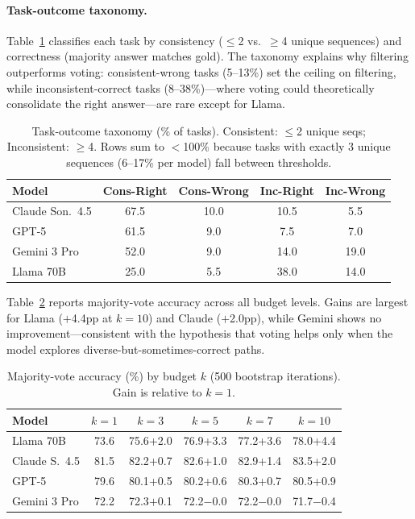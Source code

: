 \documentclass{article}
\begin{document}
\paragraph{Task-outcome taxonomy.} Table~\ref{tab:taxonomy} classifies each task by consistency ($\leq$2 vs.\ $\geq$4 unique sequences) and correctness (majority answer matches gold). The taxonomy explains why filtering outperforms voting: consistent-wrong tasks (5--13\%) set the ceiling on filtering, while inconsistent-correct tasks (8--38\%)---where voting could theoretically consolidate the right answer---are rare except for Llama.

\begin{table}[h]
\centering
\small
\caption{Task-outcome taxonomy (\% of tasks). Consistent: $\leq$2 unique seqs; Inconsistent: $\geq$4. Rows sum to $<$100\% because tasks with exactly 3 unique sequences (6--17\% per model) fall between thresholds.}
\label{tab:taxonomy}
\scriptsize
\begin{tabular}{l@{\hskip 4pt}c@{\hskip 4pt}c@{\hskip 4pt}c@{\hskip 4pt}c}
\toprule
\textbf{Model} & \textbf{Cons-Right} & \textbf{Cons-Wrong} & \textbf{Inc-Right} & \textbf{Inc-Wrong} \\
\midrule
Claude Son.\ 4.5 & 67.5 & 10.0 & 10.5 & 5.5 \\
GPT-5 & 61.5 & 9.0 & 7.5 & 7.0 \\
Gemini 3 Pro & 52.0 & 9.0 & 14.0 & 19.0 \\
Llama 70B & 25.0 & 5.5 & 38.0 & 14.0 \\
\bottomrule
\end{tabular}
\end{table}

Table~\ref{tab:vote_full} reports majority-vote accuracy across all budget levels. Gains are largest for Llama ($+$4.4pp at $k\!=\!10$) and Claude ($+$2.0pp), while Gemini shows no improvement---consistent with the hypothesis that voting helps only when the model explores diverse-but-sometimes-correct paths.

\begin{table}[h]
\centering
\small
\caption{Majority-vote accuracy (\%) by budget $k$ (500 bootstrap iterations). Gain is relative to $k\!=\!1$.}
\label{tab:vote_full}
\scriptsize
\begin{tabular}{l@{\hskip 3pt}c@{\hskip 3pt}c@{\hskip 3pt}c@{\hskip 3pt}c@{\hskip 3pt}c}
\toprule
\textbf{Model} & $k\!=\!1$ & $k\!=\!3$ & $k\!=\!5$ & $k\!=\!7$ & $k\!=\!10$ \\
\midrule
Llama 70B & 73.6 & 75.6{\tiny+2.0} & 76.9{\tiny+3.3} & 77.2{\tiny+3.6} & 78.0{\tiny+4.4} \\
Claude S.\ 4.5 & 81.5 & 82.2{\tiny+0.7} & 82.6{\tiny+1.0} & 82.9{\tiny+1.4} & 83.5{\tiny+2.0} \\
GPT-5 & 79.6 & 80.1{\tiny+0.5} & 80.2{\tiny+0.6} & 80.3{\tiny+0.7} & 80.5{\tiny+0.9} \\
Gemini 3 Pro & 72.2 & 72.3{\tiny$+$0.1} & 72.2{\tiny$-$0.0} & 72.2{\tiny$-$0.0} & 71.7{\tiny$-$0.4} \\
\bottomrule
\end{tabular}
\end{table}
\end{document}
